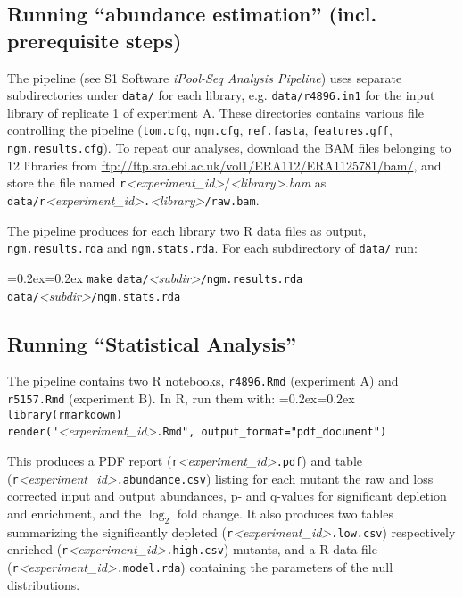\documentclass[a4paper,11pt,oneside]{amsart}
\newenvironment{codebox}%
   {\bgroup\topsep=0.2ex\partopsep=0.2ex\shaded\noindent}%
   {\endshaded\egroup}
\begin{document}
\subsection*{Running ``abundance estimation'' (incl. prerequisite steps)}

The pipeline (see S1 Software \textit{iPool-Seq Analysis Pipeline}) uses separate subdirectories under \texttt{data/} for each library, e.g. \texttt{data/r4896.in1} for the input library of replicate 1 of experiment A. These directories contains various file controlling the pipeline (\texttt{tom.cfg}, \texttt{ngm.cfg}, \texttt{ref.fasta}, \texttt{features.gff}, \texttt{ngm.results.cfg}). To repeat our analyses, download the BAM files belonging to 12 libraries from \url{ftp://ftp.sra.ebi.ac.uk/vol1/ERA112/ERA1125781/bam/}, and store the file named \texttt{r}\textit{<experiment\_id>}/\textit{<library>.bam} as \texttt{data/r}\textit{<experiment\_id>}\texttt{.}\textit{<library>}\texttt{/raw.bam}.

The pipeline produces for each library two R data files as output, \texttt{ngm.results.rda} and \texttt{ngm.stats.rda}. For each subdirectory of \texttt{data/} run:

\begin{codebox}\noindent
\texttt{make}
  \texttt{data/}\textit{<subdir>}\texttt{/ngm.results.rda}
  \texttt{data/}\textit{<subdir>}\texttt{/ngm.stats.rda}
\end{codebox}

\subsection*{Running ``Statistical Analysis''}

The pipeline contains two R notebooks, \texttt{r4896.Rmd} (experiment A) and \texttt{r5157.Rmd} (experiment B). In R, run them with:
\begin{codebox}\noindent
\texttt{library(rmarkdown)}\\
\texttt{render("}\textit{<experiment\_id>}\texttt{.Rmd", output\_format="pdf\_document")}
\end{codebox}

This produces a PDF report (\texttt{r}\textit{<experiment\_id>}\texttt{.pdf}) and table (\texttt{r}\textit{<experiment\_id>}\texttt{.abundance.csv}) listing for each mutant the raw and loss corrected input and output abundances, p- and q-values for significant depletion and enrichment, and the $\log_2$ fold change. It also produces two tables summarizing the significantly depleted (\texttt{r}\textit{<experiment\_id>}\texttt{.low.csv}) respectively enriched (\texttt{r}\textit{<experiment\_id>}\texttt{.high.csv}) mutants, and a R data file (\texttt{r}\textit{<experiment\_id>}\texttt{.model.rda}) containing the parameters of the null distributions.


\printbibliography[heading=references]
\end{document}
